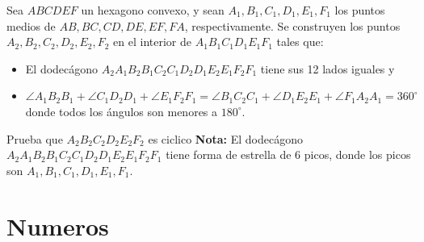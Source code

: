 \documentclass[11pt]{scrartcl}
\begin{document}
\begin{problem} [2024/3]
    Sea $ABCDEF$ un hexagono convexo, y sean $A_1,B_1,C_1,D_1,E_1,F_1$ los puntos medios de $AB,BC,CD,DE,EF,FA$, respectivamente. Se construyen los puntos $A_2,B_2,C_2,D_2,E_2,F_2$ en el interior de $A_1B_1C_1D_1E_1F_1$ tales que:
    \begin{itemize}
        \item El dodecágono $A_2A_1B_2B_1C_2C_1D_2D_1E_2E_1F_2F_1$ tiene sus 12 lados iguales y 
        \item $\angle A_1B_2B_1+\angle C_1D_2D_1+\angle E_1F_2F_1= \angle B_1C_2C_1 + \angle D_1E_2E_1 +\angle F_1A_2A_1 =360^{\circ}$ donde todos los ángulos son menores a $180^{\circ}$.
    \end{itemize}
    Prueba que $A_2B_2C_2D_2E_2F_2$ es ciclico
    \textbf{Nota: } El dodecágono $A_2A_1B_2B_1C_2C_1D_2D_1E_2E_1F_2F_1$ tiene forma de estrella de 6 picos, donde los picos son $A_1,B_1,C_1,D_1,E_1,F_1$. 
\end{problem}

\section{Numeros}
\end{document}

